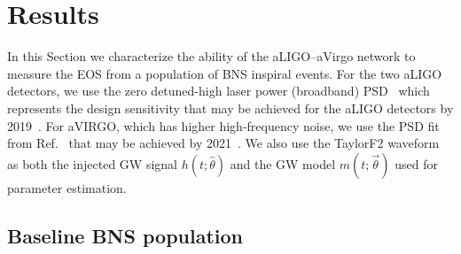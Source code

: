 \documentclass[twocolumn,prd,amssymb,aps,nofootinbib,showpacs,epsf]{revtex4}
\newcommand\ben[2]{\textcolor{red}{{#1}\sout{#2}}}
\newcommand\les[2]{\textcolor{blue}{{#1}\sout{#2}}}
\begin{document}
\section{Results}
\label{sec:results}

In this Section we characterize the ability of the aLIGO--aVirgo network to measure the EOS from a population of BNS inspiral events. For the two aLIGO detectors, we use the zero detuned-high laser power (broadband) PSD~\cite{LIGOnoise} which represents the design sensitivity that may be achieved for the aLIGO detectors by 2019~\cite{AasiAbadieAbbott2013}. For aVIRGO, which has higher high-frequency noise, we use the PSD fit from Ref.~\cite{ManzottiDietz2012} that may be achieved by 2021~\cite{AasiAbadieAbbott2013}. We also use the TaylorF2 waveform as both the injected GW signal $h(t; \hat\theta)$ and the GW model $m(t; \vec\theta)$ used for parameter estimation.



\subsection{Baseline BNS population}
\label{sec:baseline}
\end{document}
